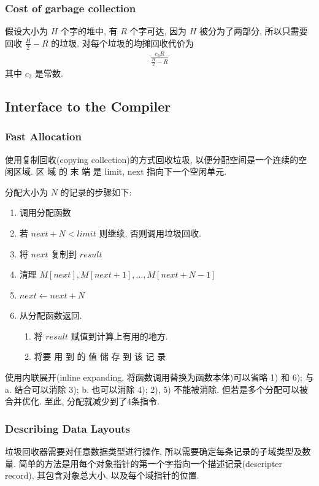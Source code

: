 \subsubsection{Cost of garbage collection}
假设大小为 $H$ 个字的堆中, 有 $R$ 个字可达, 因为 $H$ 被分为了两部分, 所以只需要回收 $\frac{H}{2}-R$ 的垃圾. 对每个垃圾的均摊回收代价为
\begin{align*}
    \frac{c_3R}{\frac{H}{2}-R}
\end{align*}
其中 $c_3$ 是常数. 


\subsection{Interface to the Compiler}

\subsubsection{Fast Allocation}
使用复制回收(copying collection)的方式回收垃圾, 以便分配空间是一个连续的空闲区域. 区 域 的 末 端 是 limit, next 指向下一个空闲单元.

分配大小为 $N$ 的记录的步骤如下: 
\begin{enumerate}
    \item 调用分配函数
    \item 若 $next+N<limit$ 则继续, 否则调用垃圾回收.
    \item 将 $next$ 复制到 $result$
    \item 清理 $M[next], M[next+1],\dots,M[next+N-1]$
    \item $next\leftarrow next+N$
    \item 从分配函数返回. 
    \begin{enumerate}
        \item 将 $result$ 赋值到计算上有用的地方.
        \item 将要 用 到 的 值 储 存 到 该 记 录 
    \end{enumerate}
\end{enumerate}

使用内联展开(inline expanding, 将函数调用替换为函数本体)可以省略 1) 和 6); 与 a. 结合可以消除 3); b. 也可以消除 4); 2), 5) 不能被消除. 但若是多个分配可以被合并优化. 至此, 分配就减少到了4条指令. 


\subsubsection{Describing Data Layouts}
垃圾回收器需要对任意数据类型进行操作, 所以需要确定每条记录的子域类型及数量. 简单的方法是用每个对象指针的第一个字指向一个描述记录(descripter record), 其包含对象总大小, 以及每个域指针的位置. 

